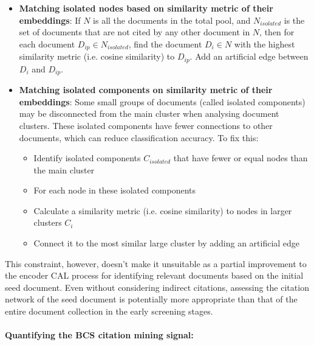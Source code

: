 \documentclass[10pt,oneside]{book}
\begin{document}
\begin{itemize}
    \item \textbf{Matching isolated nodes based on similarity metric of their embeddings}: If $N$ is all the documents in the total pool, and $N_{isolated}$ is the set of documents that are not cited by any other document in $N$, then for each document $D_{ip} \in N_{isolated}$, find the document $D_i \in N$ with the highest similarity metric (i.e. cosine similarity) to $D_{ip}$. Add an artificial edge between $D_i$ and $D_{ip}$.
    \item \textbf{Matching isolated components on similarity metric of their embeddings}: Some small groups of documents (called isolated components) may be disconnected from the main cluster when analysing document clusters. These isolated components have fewer connections to other documents, which can reduce classification accuracy. To fix this:
    \begin{itemize}
        \item Identify isolated components $C_{isolated}$ that have fewer or equal nodes than the main cluster
        \item For each node in these isolated components
        \item Calculate a similarity metric (i.e. cosine similarity) to nodes in larger clusters $C_i$
        \item Connect it to the most similar large cluster by adding an artificial edge
    \end{itemize}

\end{itemize}

This constraint, however, doesn't make it unsuitable as a partial improvement to the encoder CAL process for identifying relevant documents based on the initial seed document. Even without considering indirect citations, assessing the citation network of the seed document is potentially more appropriate than that of the entire document collection in the early screening stages.

\paragraph{Quantifying the BCS citation mining signal: }
\end{document}
